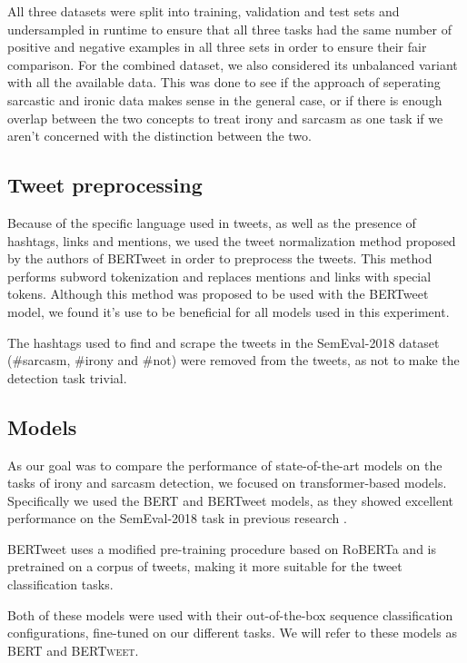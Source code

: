 \documentclass[10pt, a4paper]{article}
\begin{document}
All three datasets were split into training, validation and test sets and undersampled in runtime to ensure that all three
tasks had the same number of positive and negative examples in all three sets in order to ensure their fair comparison. For
the combined dataset, we also considered its unbalanced variant with all the available data. This was done to see if the 
approach of seperating sarcastic and ironic data makes sense in the general case, or if there is enough overlap between 
the two concepts to treat irony and sarcasm as one task if we aren't concerned with the distinction between the two.

\subsection{Tweet preprocessing}
Because of the specific language used in tweets, as well as the presence of hashtags, links and mentions, we used the
tweet normalization method proposed by the authors of BERTweet \citep{bertweet} in order to preprocess the tweets. This method
performs subword tokenization and replaces mentions and links with special tokens. Although this method was proposed to be 
used with the BERTweet model, we found it's use to be beneficial for all models used in this experiment.

The hashtags used to find and scrape the tweets in the SemEval-2018 dataset (\#sarcasm, \#irony and \#not) were removed
from the tweets, as not to make the detection task trivial.

\subsection{Models}\label{sec:models}

As our goal was to compare the performance of state-of-the-art models on the tasks of irony and sarcasm detection, we 
focused on transformer-based models. Specifically we used the BERT \citep{devlin-etal-2019-bert} and BERTweet \citep{bertweet} models,
as they showed excellent performance on the SemEval-2018 task in previous research \citep{transformers4irony-2020,bertweet}.

BERTweet uses a modified pre-training procedure based on RoBERTa \citep{roberta} and is pretrained on a corpus of tweets, 
making it more suitable for the tweet classification tasks.

Both of these models were used with their out-of-the-box sequence classification configurations, fine-tuned on our 
different tasks. We will refer to these models as \textsc{BERT} and \textsc{BERTweet}.
\end{document}
